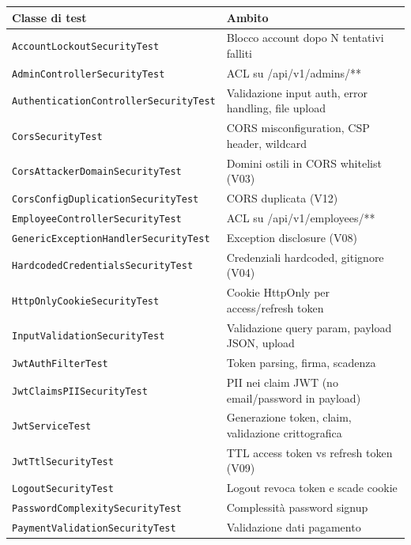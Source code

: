 \documentclass[12pt, a4paper]{article}
\begin{document}
    \begin{table}[H]
        \centering
        \small
        \begin{tabular}{|p{8cm}|p{10cm}|}
            \hline
            \textbf{Classe di test} & \textbf{Ambito} \\
            \hline
            \texttt{AccountLockoutSecurityTest} & Blocco account dopo N tentativi falliti \\
            \texttt{AdminControllerSecurityTest} & ACL su /api/v1/admins/** \\
            \texttt{AuthenticationControllerSecurityTest} & Validazione input auth, error handling, file upload \\
            \texttt{CorsSecurityTest} & CORS misconfiguration, CSP header, wildcard \\
            \texttt{CorsAttackerDomainSecurityTest} & Domini ostili in CORS whitelist (V03) \\
            \texttt{CorsConfigDuplicationSecurityTest} & CORS duplicata (V12) \\
            \texttt{EmployeeControllerSecurityTest} & ACL su /api/v1/employees/** \\
            \texttt{GenericExceptionHandlerSecurityTest} & Exception disclosure (V08) \\
            \texttt{HardcodedCredentialsSecurityTest} & Credenziali hardcoded, gitignore (V04) \\
            \texttt{HttpOnlyCookieSecurityTest} & Cookie HttpOnly per access/refresh token \\
            \texttt{InputValidationSecurityTest} & Validazione query param, payload JSON, upload \\
            \texttt{JwtAuthFilterTest} & Token parsing, firma, scadenza \\
            \texttt{JwtClaimsPIISecurityTest} & PII nei claim JWT (no email/password in payload) \\
            \texttt{JwtServiceTest} & Generazione token, claim, validazione crittografica \\
            \texttt{JwtTtlSecurityTest} & TTL access token vs refresh token (V09) \\
            \texttt{LogoutSecurityTest} & Logout revoca token e scade cookie \\
            \texttt{PasswordComplexitySecurityTest} & Complessità password signup \\
            \texttt{PaymentValidationSecurityTest} & Validazione dati pagamento \\

\end{tabular}
\end{table}
\end{document}
